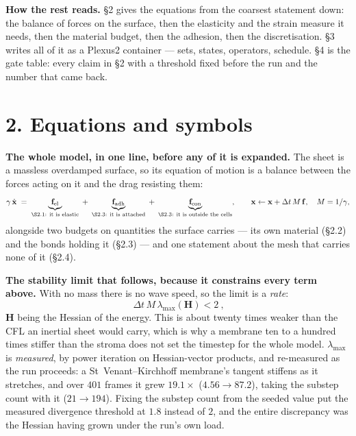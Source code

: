 \documentclass[10pt,a4paper]{article}
\begin{document}
\textbf{How the rest reads.} \S2 gives the equations from the coarsest statement down: the balance of
forces on the surface, then the elasticity and the strain measure it needs, then the material budget,
then the adhesion, then the discretisation. \S3 writes all of it as a Plexus2 container --- sets,
states, operators, schedule. \S4 is the gate table: every claim in \S2 with a threshold fixed before
the run and the number that came back.

\section*{2.\; Equations and symbols}

\textbf{The whole model, in one line, before any of it is expanded.} The sheet is a massless
overdamped surface, so its equation of motion is a balance between the forces acting on it and the drag
resisting them:
%
\begin{equation}
\gamma\,\dot{\mathbf x} \;=\;
\underbrace{\mathbf f_{\rm el}}_{\text{\S2.1: it is elastic}}
\;+\;\underbrace{\mathbf f_{\rm adh}}_{\text{\S2.3: it is attached}}
\;+\;\underbrace{\mathbf f_{\rm con}}_{\text{\S2.3: it is outside the cells}},
\qquad
\mathbf x\leftarrow\mathbf x+\Delta t\,M\,\mathbf f,\quad M=1/\gamma,
\label{eq:motion}
\end{equation}
%
alongside two budgets on quantities the surface carries --- its own material (\S2.2) and the bonds
holding it (\S2.3) --- and one statement about the mesh that carries none of it (\S2.4).

\textbf{The stability limit that follows, because it constrains every term above.} With no mass there
is no wave speed, so the limit is a \emph{rate}:
%
\begin{equation}
\boxed{\ \Delta t\,M\,\lambda_{\max}(\mathbf H)<2\ },
\label{eq:step}
\end{equation}
%
$\mathbf H$ being the Hessian of the energy. This is about twenty times weaker than the CFL an inertial
sheet would carry, which is why a membrane ten to a hundred times stiffer than the stroma does not set
the timestep for the whole model. $\lambda_{\max}$ is \emph{measured}, by power iteration on
Hessian-vector products, and re-measured as the run proceeds: a St~Venant--Kirchhoff membrane's tangent
stiffens as it stretches, and over $401$ frames it grew $19.1\times$ ($4.56\to87.2$), taking the substep
count with it ($21\to194$). Fixing the substep count from the seeded value put the measured divergence
threshold at $1.8$ instead of $2$, and the entire discrepancy was the Hessian having grown under the
run's own load.
\end{document}
